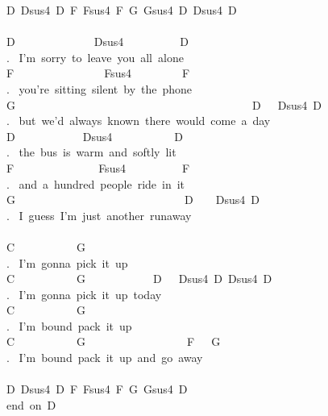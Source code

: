{D\ Dsus4\ D\ F\ Fsus4\ F\ G\ Gsus4\ D\ Dsus4\ D\\
\\
D\ \ \ \ \ \ \ \ \ \ \ \ \ \ Dsus4\ \ \ \ \ \ \ \ \ \ D\\
. \ I'm\ sorry\ to\ leave\ you\ all\ alone\\
F\ \ \ \ \ \ \ \ \ \ \ \ \ \ \ \ Fsus4\ \ \ \ \ \ \ \ \ F\\
. \ you're\ sitting\ silent\ by\ the\ phone\\
G\ \ \ \ \ \ \ \ \ \ \ \ \ \ \ \ \ \ \ \ \ \ \ \ \ \ \ \ \ \ \ \ \ \ \ \ \ \ \ \ \ \ D\ \ \ Dsus4\ D\\
. \ but\ we'd\ always\ known\ there\ would\ come\ a\ day\\
D\ \ \ \ \ \ \ \ \ \ \ \ Dsus4\ \ \ \ \ \ \ \ \ \ \ D\\
. \ the\ bus\ is\ warm\ and\ softly\ lit\ \\
F\ \ \ \ \ \ \ \ \ \ \ \ \ \ \ Fsus4\ \ \ \ \ \ \ \ \ \ F\\
. \ and\ a\ hundred\ people\ ride\ in\ it\\
G\ \ \ \ \ \ \ \ \ \ \ \ \ \ \ \ \ \ \ \ \ \ \ \ \ \ \ \ \ \ D\ \ \ \ Dsus4\ D\\
. \ I\ guess\ I'm\ just\ another\ runaway\\
\\
C\ \ \ \ \ \ \ \ \ \ \ G\\
. \ I'm\ gonna\ pick\ it\ up\\
C\ \ \ \ \ \ \ \ \ \ \ G\ \ \ \ \ \ \ \ \ \ \ \ D\ \ \ Dsus4\ D\ Dsus4\ D\\
. \ I'm\ gonna\ pick\ it\ up\ today\\
C\ \ \ \ \ \ \ \ \ \ \ G\\
. \ I'm\ bound\ pack\ it\ up\\
C\ \ \ \ \ \ \ \ \ \ \ G\ \ \ \ \ \ \ \ \ \ \ \ \ \ \ \ \ \ F\ \ \ G\\
. \ I'm\ bound\ pack\ it\ up\ and\ go\ away\\
\\
D\ Dsus4\ D\ F\ Fsus4\ F\ G\ Gsus4\ D\\
end\ on\ D\\}
